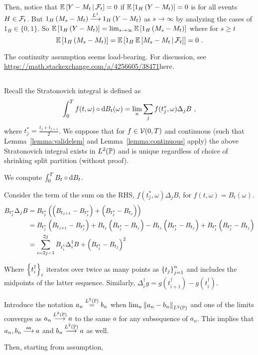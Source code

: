 \documentclass{article}
\begin{document}
Then, notice that \(\CE{Y-M_t}{\mcF_t}=0\) if \(\E\ha{1_H\pa{Y-M_t}}=0\) is for all events \(H\in \mcF_t\).
But \(1_H\pa{M_s-M_t}\convarg{L^1}1_H\pa{Y-M_t}\) as \(s\rightarrow\infty\) by analyzing the cases of \(1_H\in\{0,1\}\). So \(\E\ha{1_H\pa{Y-M_t}}=\lim_{s\rightarrow\infty}\E\ha{1_H\pa{M_s-M_t}}\) where for \(s\ge t\)
\[
  \E\ha{1_H\pa{M_s-M_t}}=\E \ha{1_H\CE{M_s-M_t}{\mcF_t}}=0\,\,.
\]

The continuity assumption seems load-bearing. For discussion, see \url{https://math.stackexchange.com/a/4256605/38471}{here}.

\subsection{}\label{ex3.9}

Recall the Stratonovich integral is defined as
\[
  \int_0^Tf(t,\omega)\circ\d{B_t(\omega)}=\lim_n\sum_jf(t_j^*,\omega)\Delta_jB\,\,,
\]
where \(t_j^*=\frac{t_j+t_{j+1}}{2}\). We suppose that for \(f\in\mcV(0, T)\) and continuous (such that Lemma~\ref{lemma:validelem} and Lemma~\ref{lemma:continuous} apply) the above Stratonovich integral exists in \(L^2(\P)\) and is unique regardless of choice of shrinking split partition (without proof).

We compute \(\int_0^TB_t\circ\d{B_t}\).

Consider the term of the sum on the RHS, \(f(t_j^*,\omega)\Delta_jB\), for \(f(t,\omega)=B_t(\omega)\).
\begin{align*}
  B_{t_j^*}\Delta_jB
  &=B_{t_j^*}\pa{\pa{B_{t_{j+1}}-B_{t_j^*}}+\pa{B_{t_j^*}-B_{t_j}}}\\
  &=B_{t_j^*}\pa{B_{t_{j+1}}-B_{t_j^*}}+B_{t_j}\pa{B_{t_{j}^*}-B_{t_j}}
    -B_{t_j}\pa{B_{t_{j}^*}-B_{t_j}}+B_{t_j^*}\pa{B_{t_j^*}-B_{t_j}}\\
  &=\sum_{i=2j-1}^{2j}B_{t_i^\dag}\Delta_i^\dag B+\pa{B_{t_j^*}-B_{t_j}}^2
\end{align*}

Where \(\ca{t_i^\dag}_i\) iterates over twice as many points as \(\ca{t_j}_{j=1}^n\) and includes the midpoints of the latter sequence. Similarly, \(\Delta_i^\dag g=g(t_{i+1}^\dag)-g(t_{i}^\dag)\).

Introduce the notation \(a_n\lpeq b_n\) when \(\lim_n\norm{a_n-b_n}_{L^2(\P)}\) and one of the limits converges as \(a_n\convlp a\) to the same \(a\) for any subsequence of \(a_n\). This implies that \(a_n,b_n\convas a\) and \(b_n\convlp a\) as well.

Then, starting from assumption,
\end{document}
